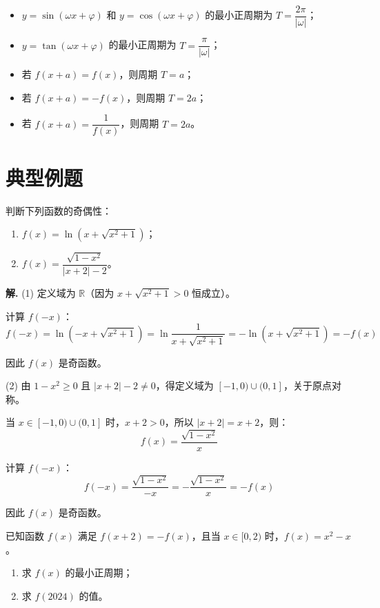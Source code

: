 \documentclass[11pt]{ctexrep}
\begin{document}
\begin{property}[常见函数的周期]
    \begin{itemize}
        \item $y = \sin(\omega x + \varphi)$ 和 $y = \cos(\omega x + \varphi)$ 的最小正周期为 $T = \dfrac{2\pi}{|\omega|}$；
        \item $y = \tan(\omega x + \varphi)$ 的最小正周期为 $T = \dfrac{\pi}{|\omega|}$；
        \item 若 $f(x+a) = f(x)$，则周期 $T = a$；
        \item 若 $f(x+a) = -f(x)$，则周期 $T = 2a$；
        \item 若 $f(x+a) = \dfrac{1}{f(x)}$，则周期 $T = 2a$。
    \end{itemize}
\end{property}

\section*{典型例题}

\begin{example}[奇偶性的判定]
    判断下列函数的奇偶性：
    \begin{enumerate}
        \item $f(x) = \ln\left(x + \sqrt{x^2+1}\right)$；
        \item $f(x) = \dfrac{\sqrt{1-x^2}}{|x+2|-2}$。
    \end{enumerate}
\end{example}

\textbf{解.} (1) 定义域为 $\mathbb{R}$（因为 $x + \sqrt{x^2+1} > 0$ 恒成立）。

计算 $f(-x)$：
\[
    f(-x) = \ln\left(-x + \sqrt{x^2+1}\right) = \ln\frac{1}{x + \sqrt{x^2+1}} = -\ln\left(x + \sqrt{x^2+1}\right) = -f(x)
\]

因此 $f(x)$ 是奇函数。

(2) 由 $1-x^2 \geq 0$ 且 $|x+2|-2 \neq 0$，得定义域为 $[-1, 0) \cup (0, 1]$，关于原点对称。

当 $x \in [-1, 0) \cup (0, 1]$ 时，$x+2 > 0$，所以 $|x+2| = x+2$，则：
\[
    f(x) = \frac{\sqrt{1-x^2}}{x}
\]

计算 $f(-x)$：
\[
    f(-x) = \frac{\sqrt{1-x^2}}{-x} = -\frac{\sqrt{1-x^2}}{x} = -f(x)
\]

因此 $f(x)$ 是奇函数。

\begin{example}[周期性的应用]
    已知函数 $f(x)$ 满足 $f(x+2) = -f(x)$，且当 $x \in [0, 2)$ 时，$f(x) = x^2 - x$。
    \begin{enumerate}
        \item 求 $f(x)$ 的最小正周期；
        \item 求 $f(2024)$ 的值。
    \end{enumerate}
\end{example}
\end{document}
